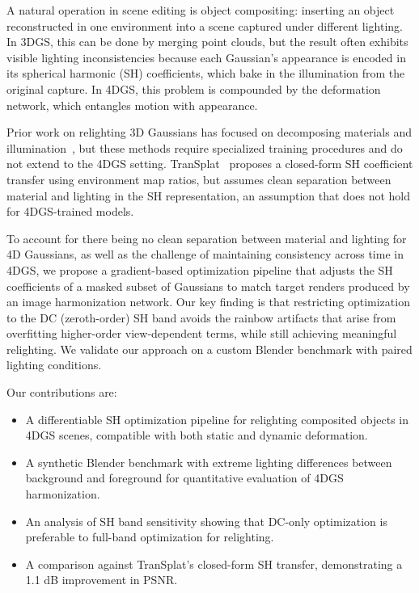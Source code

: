 \documentclass[10pt,twocolumn,letterpaper]{article}
\begin{document}
A natural operation in scene editing is object compositing: inserting an object reconstructed in one environment into a scene captured under different lighting. In 3DGS, this can be done by merging point clouds, but the result often exhibits visible lighting inconsistencies because each Gaussian's appearance is encoded in its spherical harmonic (SH) coefficients, which bake in the illumination from the original capture. In 4DGS, this problem is compounded by the deformation network, which entangles motion with appearance.

Prior work on relighting 3D Gaussians has focused on decomposing materials and illumination~\cite{gao2023relightable3dgaussian}, but these methods require specialized training procedures and do not extend to the 4DGS setting. TranSplat~\cite{chen2024transsplat} proposes a closed-form SH coefficient transfer using environment map ratios, but assumes clean separation between material and lighting in the SH representation, an assumption that does not hold for 4DGS-trained models.

To account for there being no clean separation between material and lighting for 4D Gaussians, as well as the challenge of maintaining consistency across time in 4DGS, we propose a gradient-based optimization pipeline that adjusts the SH coefficients of a masked subset of Gaussians to match target renders produced by an image harmonization network. Our key finding is that restricting optimization to the DC (zeroth-order) SH band avoids the rainbow artifacts that arise from overfitting higher-order view-dependent terms, while still achieving meaningful relighting. We validate our approach on a custom Blender benchmark with paired lighting conditions.

Our contributions are:
\begin{itemize}
\item A differentiable SH optimization pipeline for relighting composited objects in 4DGS scenes, compatible with both static and dynamic deformation.
\item A synthetic Blender benchmark with extreme lighting differences between background and foreground for quantitative evaluation of 4DGS harmonization.
\item An analysis of SH band sensitivity showing that DC-only optimization is preferable to full-band optimization for relighting.
\item A comparison against TranSplat's closed-form SH transfer, demonstrating a 1.1 dB improvement in PSNR.
\end{itemize}
\end{document}
